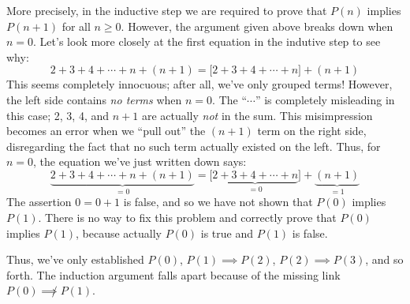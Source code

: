 \begin{problem}
{More precisely, in the inductive step we are required to prove that
$P(n)$ implies $P(n+1)$ for all $n \geq 0$.  However, the argument
given above breaks down when $n = 0$.  Let's look more closely at the
first equation in the indutive step to see why:
%
\[
2 + 3 + 4 + \cdots + n + (n+1)
     = \bigl[2 + 3 + 4 + \cdots + n\bigr] + (n+1)
\]
%
This seems completely innocuous; after all, we've only grouped terms!
However, the left side contains \textit{no terms} when $n = 0$.  The
``$\cdots$'' is completely misleading in this case; 2, 3, 4, and
$n+1$ are actually \textit{not} in the sum.  This misimpression
becomes an error when we ``pull out'' the $(n+1)$ term on the right
side, disregarding the fact that no such term actually existed on the
left.  Thus, for $n = 0$, the equation we've just written down says:
%
\[
\underbrace{2 + 3 + 4 + \cdots + n + (n+1)}_{= 0}
     = \bigl[\underbrace{2 + 3 + 4 + \cdots + n}_{= 0}\bigr] +
       \underbrace{(n+1)}_{= 1}
\]
%
The assertion $0 = 0 + 1$ is false, and so we have not shown that
$P(0)$ implies $P(1)$.  There is no way to fix this problem and
correctly prove that $P(0)$ implies $P(1)$, because actually $P(0)$ is
true and $P(1)$ is false.

Thus, we've only established $P(0)$, $P(1) \implies P(2)$, $P(2)
\implies P(3)$, and so forth.  The induction argument falls apart
because of the missing link $P(0) \not\implies P(1)$.}
\end{problem}


